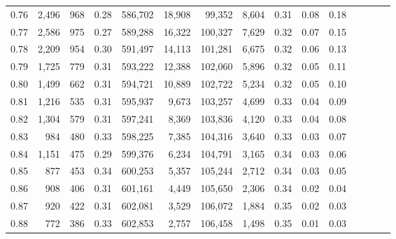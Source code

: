 \begin{tabular}{rrrcrrrrrrrrrrr}
0.76 &   2,496 &    968 &                                       0.28 &  586,702 &   18,908 &   99,352 &    8,604 &  0.31 &  0.08 &                         0.18 \\
0.77 &   2,586 &    975 &                                       0.27 &  589,288 &   16,322 &  100,327 &    7,629 &  0.32 &  0.07 &                         0.15 \\
0.78 &   2,209 &    954 &                                       0.30 &  591,497 &   14,113 &  101,281 &    6,675 &  0.32 &  0.06 &                         0.13 \\
0.79 &   1,725 &    779 &                                       0.31 &  593,222 &   12,388 &  102,060 &    5,896 &  0.32 &  0.05 &                         0.11 \\
0.80 &   1,499 &    662 &                                       0.31 &  594,721 &   10,889 &  102,722 &    5,234 &  0.32 &  0.05 &                         0.10 \\
0.81 &   1,216 &    535 &                                       0.31 &  595,937 &    9,673 &  103,257 &    4,699 &  0.33 &  0.04 &                         0.09 \\
0.82 &   1,304 &    579 &                                       0.31 &  597,241 &    8,369 &  103,836 &    4,120 &  0.33 &  0.04 &                         0.08 \\
0.83 &     984 &    480 &                                       0.33 &  598,225 &    7,385 &  104,316 &    3,640 &  0.33 &  0.03 &                         0.07 \\
0.84 &   1,151 &    475 &                                       0.29 &  599,376 &    6,234 &  104,791 &    3,165 &  0.34 &  0.03 &                         0.06 \\
0.85 &     877 &    453 &                                       0.34 &  600,253 &    5,357 &  105,244 &    2,712 &  0.34 &  0.03 &                         0.05 \\
0.86 &     908 &    406 &                                       0.31 &  601,161 &    4,449 &  105,650 &    2,306 &  0.34 &  0.02 &                         0.04 \\
0.87 &     920 &    422 &                                       0.31 &  602,081 &    3,529 &  106,072 &    1,884 &  0.35 &  0.02 &                         0.03 \\
0.88 &     772 &    386 &                                       0.33 &  602,853 &    2,757 &  106,458 &    1,498 &  0.35 &  0.01 &                         0.03 \\

\end{tabular}
